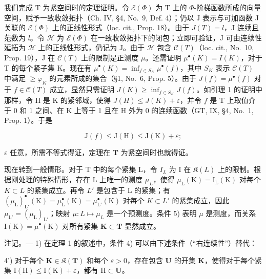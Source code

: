 我们完成 T 为紧空间时的定理证明。令 \(\mathcal{E}(\Phi)\) 为 T 上的 \(\Phi\)-阶梯函数所成的向量空间，赋予一致收敛拓扑（Ch. IV, §4, No.~9, Def. 4）；仍以 J 表示与可加函数 J 关联的 \(\mathcal{E}(\Phi)\) 上的正线性形式（loc. cit., Prop. 18）。由于 \(J(T) = l\)，J 连续且范数为 \(l\)。令 \(\mathcal{H}\) 为 \(\mathcal{E}(\Phi)\) 在一致收敛拓扑下的闭包；立即可验证，J 可由连续性延拓为 \(\mathcal{H}\) 上的正线性形式，仍记为 J。由于 \(\mathcal{H}\) 包含 \(\mathcal{C}(T)\)（loc. cit., No.~10, Prop. 19），J 在 \(\mathcal{C}(T)\) 上的限制是正测度 \(\mu\)。还需证明 \(\mu^{\bullet}(K) = I(K)\)，对于 T 的每个紧子集 K。现在有 \(\mu^{\bullet}(K) = \inf_{f \in S_K} \mu^{\bullet}(f)\)，其中 \(S_K\) 表示 \(\mathcal{C}(T)\) 中满足 \(\geqslant \varphi_K\) 的元素所成的集合（§1, No.~6, Prop. 5）。由于 \(J(f) = \mu^{\bullet}(f)\) 对于 \(f \in \mathcal{C}(T)\) 成立，显然只需证明 \(J(K) \geqslant \inf_{f \in S_K} J(f)\)。如引理 1 的证明中那样，令 H 是 K 的紧邻域，使得 \(J(H) \leqslant J(K) + \varepsilon\)，并令 \(f\) 是 T 上取值介于 0 和 1 之间、在 K 上等于 1 且在 H 外为 0 的连续函数（GT, IX, §4, No.~1, Prop. 1）。于是

\[
\mathrm{J} (f) \leqslant \mathrm{J} (\mathrm{H}) \leqslant \mathrm{J} (\mathrm{K}) + \varepsilon ;
\]

\(\varepsilon\) 任意，所需不等式得证，定理在 \(\mathbf{T}\) 为紧空间时也就得证。

现在转到一般情形。对于 T 中的每个紧集 L，令 \(I_{L}\) 为 I 在 \(\mathfrak{K}(L)\) 上的限制。根据刚处理的特殊情形，存在 L 上唯一的测度 \(\mu_{L}\)，使得 \(\mu_{\mathrm{L}}(\mathrm{K}) = \mathrm{I}_{\mathrm{L}}(\mathrm{K})\) 对每个 \(K \subset L\) 的紧集成立。再令 \(L'\) 是包含于 L 的紧集；有 \((\mu_{\mathrm{L}})_{\mathrm{L}'}^{\bullet}(\mathrm{K}) = \mu_{\mathrm{L}}^{\bullet}(\mathrm{K}) = \mu_{\mathrm{L}'}^{\bullet}(\mathrm{K})\) 对每个 \(K \subset L'\) 的紧集成立，因此 \(\mu_{\mathrm{L}'} = (\mu_{\mathrm{L}})_{\mathrm{L}'}\)；映射 \(\mu : L \mapsto \mu_{L}\) 是一个预测度。条件 5) 表明 \(\mu\) 是测度，而关系 \(\mathrm{I}(\mathrm{K}) = \mu^{\bullet}(\mathrm{K})\) 对所有紧集 \(\mathbf{K} \subset \mathbf{T}\) 显然成立。

注记。--- 1) 在定理 1 的叙述中，条件 4) 可以由下述条件（“右连续性”）替代：

4') 对于每个 \(\mathbf{K} \in \mathfrak{K}(\mathbf{T})\) 和每个 \(\varepsilon > 0\)，存在包含 \(\mathbf{U}\) 的开集 \(\mathbf{K}\)，使得对于每个紧集 \(\mathrm{I}(\mathrm{H}) \leqslant \mathrm{I}(\mathrm{K}) + \varepsilon\)，都有 \(\mathrm{H} \subset \mathbf{U}\)。


